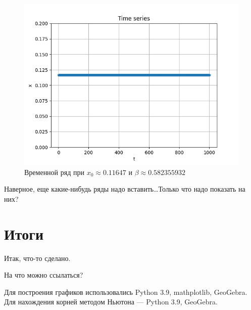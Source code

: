     \begin{figure}[h]
        \includegraphics[scale=0.8]{images/Time_series_x_011647_b_0582355932.png}    
        \caption{Временной ряд при \(x_0 \approx 0.11647\) и \(\beta \approx 0.582355932\)}
    \end{figure}

    Наверное, еще какие-нибудь ряды надо вставить\dots Только что надо показать на них?

\section{Итоги}

    Итак, что-то сделано.

    На что можно ссылаться?

    Для построения графиков использовались Python 3.9, mathplotlib, GeoGebra. Для нахождения корней методом Ньютона --- Python 3.9, GeoGebra.
